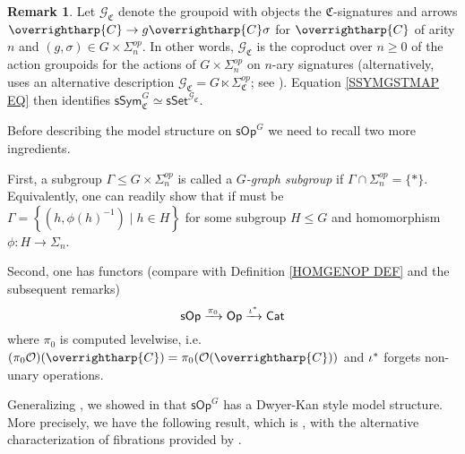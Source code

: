 \documentclass[a4paper,10pt
,draft
]{article}%
\numberwithin{equation}{section}
\numberwithin{figure}{section}
\theoremstyle{definition} %
\newtheorem{remark}[equation]{Remark}%
\newcommand{\sets}[2]{\left\{ #1 \;|\; #2\right\}}%
\newcommand{\vect}[1]{\text{\overrightharp{\ensuremath{#1}}}}
\renewcommand{\O}{\ensuremath{\mathcal O}}
\newcommand{\1}{\ensuremath{\mathbbm 1}}%
\begin{document}
\begin{remark}\label{SYMGCPRESH REM}
	Let $\mathcal{G}_{\mathfrak{C}}$
	denote the groupoid with objects the 
	$\mathfrak{C}$-signatures
	and arrows 
	$\vect{C} \to g \vect{C} \sigma$
	for $\vect{C}$ of arity $n$
	and $(g,\sigma) \in G \times \Sigma^{op}_n$.
	In other words, 
	$\mathcal{G}_{\mathfrak{C}}$
	is the coproduct over $n\geq 0$ of the action groupoids 
	for the actions of
	$G \times \Sigma^{op}_n$
	on $n$-ary signatures
	(alternatively, 
	\cite{BP_FCOP} uses an alternative description
	$\mathcal{G}_{\mathfrak{C}}
	= G \ltimes \Sigma_{\mathfrak{C}}^{op}$;
	see \cite[Prop. \ref{OC-EQUIVFNCON PROP}]{BP_FCOP}).
%	
	Equation \eqref{SSYMGSTMAP EQ} then identifies 
	$\mathsf{sSym}^G_{\mathfrak{C}} \simeq 
	\mathsf{sSet}^{\mathcal{G}_{\mathfrak{C}}}$.	
\end{remark}





Before describing the model structure on $\mathsf{sOp}^G$
we need to recall two more ingredients.

First, 
a subgroup $\Gamma \leq G \times \Sigma_n^{op}$
is called a \emph{$G$-graph subgroup}
if $\Gamma \cap \Sigma_n^{op} = \{*\}$.
Equivalently, one can readily show
that if must be
$\Gamma = \sets{(h,\phi(h)^{-1})}{h \in H}$
for some subgroup $H \leq G$
and homomorphism $\phi \colon H \to \Sigma_n$.

Second, one has functors (compare with Definition \ref{HOMGENOP DEF} and the subsequent remarks)
\[
	\mathsf{sOp} \xrightarrow{\pi_0}
	\mathsf{Op} \xrightarrow{\iota^{\**}}
	\mathsf{Cat}
\]
where $\pi_0$ is computed levelwise,
i.e. 
$(\pi_0 \O)(\vect{C}) = 
\pi_0(\O(\vect{C}))$
and
$\iota^{\**}$ forgets non-unary operations.

Generalizing \cite{Ber07b,CM13b},
we showed in \cite{BP_ACOP}
that $\mathsf{sOp}^G$ 
has a Dwyer-Kan style model structure.
More precisely, we have the following result, which is
\cite[Thm. \ref{AC-THMA}]{BP_ACOP},
with the alternative characterization of fibrations 
provided by 
\cite[Prop. \ref{AC-ISOFIBHARD PROP}]{BP_ACOP}.
\end{document}
